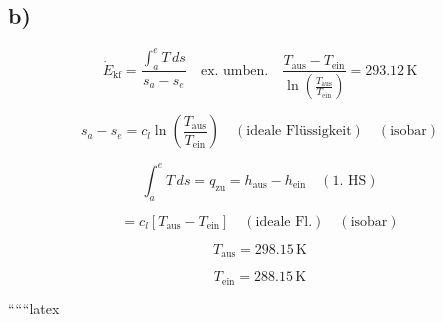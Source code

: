 

\subsection*{b)}

\[
\dot{E}_{\text{kf}} = \frac{\int_a^e T \, ds}{s_a - s_e} \quad \text{ex. umben.} \quad \frac{T_{\text{aus}} - T_{\text{ein}}}{\ln \left( \frac{T_{\text{aus}}}{T_{\text{ein}}} \right)} = 293.12 \, \text{K}
\]

\[
s_a - s_e = c_{l} \ln \left( \frac{T_{\text{aus}}}{T_{\text{ein}}} \right) \quad (\text{ideale Flüssigkeit}) \quad (\text{isobar})
\]

\[
\int_a^e T \, ds = q_{\text{zu}} = h_{\text{aus}} - h_{\text{ein}} \quad (\text{1. HS})
\]

\[
= c_{l} \left[ T_{\text{aus}} - T_{\text{ein}} \right] \quad (\text{ideale Fl.}) \quad (\text{isobar})
\]

\[
T_{\text{aus}} = 298.15 \, \text{K}
\]

\[
T_{\text{ein}} = 288.15 \, \text{K}
\]

``````latex